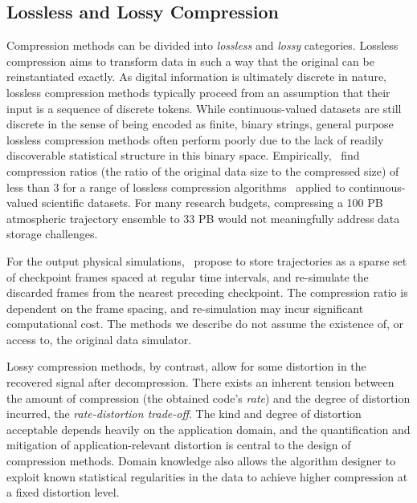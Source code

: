 \documentclass[11pt, a4paper, logo, copyright, numbering]{googledeepmind}
\begin{document}
\subsection{Lossless and Lossy Compression}
\label{sx:methods:lossless-lossy}
Compression methods can be divided into \emph{lossless} and \emph{lossy} categories.
Lossless compression aims to transform data in such a way that the original can be reinstantiated exactly.
As digital information is ultimately discrete in nature, lossless compression methods typically proceed from an assumption that their input is a sequence of discrete tokens.
While continuous-valued datasets are still discrete in the sense of being encoded as finite, binary strings, general purpose lossless compression methods often perform poorly due to the lack of readily discoverable statistical structure in this binary space.
Empirically,~\citet{sdrbench_2020} find compression ratios (the ratio of the original data size to the compressed size) of less than 3 for a range of lossless compression algorithms~\citep{zstd, zfpy_2014, fpc_2009, blosc, fpzip_2006} applied to continuous-valued scientific datasets. For many research budgets, compressing a 100 PB atmospheric trajectory ensemble to 33 PB would not meaningfully address data storage challenges.

For the output physical simulations,~\cite{simfs_girolamo_2019} propose to store trajectories as a sparse set of checkpoint frames spaced at regular time intervals, and re-simulate the discarded frames from the nearest preceding checkpoint. The compression ratio is dependent on the frame spacing, and re-simulation may incur significant computational cost. The methods we describe do not assume the existence of, or access to, the original data simulator.

Lossy compression methods, by contrast, allow for some distortion in the recovered signal after decompression.
There exists an inherent tension between the amount of compression (the obtained code's \emph{rate}) and the degree of distortion incurred, the \emph{rate-distortion trade-off}.
The kind and degree of distortion acceptable depends heavily on the application domain, and the quantification and mitigation of application-relevant distortion is central to the design of compression methods.
Domain knowledge also allows the algorithm designer to exploit known statistical regularities in the data to achieve higher compression at a fixed distortion level.
\end{document}
